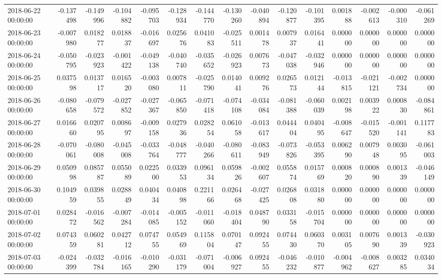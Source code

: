 \begin{tabular}{lrrrrrrrrrrrrrr}
2018-06-22 00:00:00 & -0.137498 & -0.149996 & -0.104882 & -0.095703 & -0.128934 & -0.144770 & -0.130260 & -0.040894 & -0.120877 & -0.101395 & 0.001888 & -0.002613 & -0.000310 & -0.061269 \\
2018-06-23 00:00:00 & -0.007980 & 0.018277 & 0.018837 & -0.016697 & 0.025676 & 0.041083 & -0.025511 & 0.001478 & 0.007937 & 0.016441 & 0.000000 & 0.000000 & 0.000000 & 0.000000 \\
2018-06-24 00:00:00 & -0.050795 & -0.023923 & -0.001422 & -0.049138 & -0.040740 & -0.035652 & -0.026923 & 0.007673 & -0.047038 & -0.032946 & 0.000000 & 0.000000 & 0.000000 & 0.000000 \\
2018-06-25 00:00:00 & 0.037598 & 0.013717 & 0.016520 & -0.003080 & 0.007811 & -0.025790 & 0.014041 & 0.009276 & 0.026573 & 0.012144 & -0.013815 & -0.021121 & -0.002734 & 0.000000 \\
2018-06-26 00:00:00 & -0.080658 & -0.079572 & -0.027852 & -0.027367 & -0.065850 & -0.071418 & -0.074108 & -0.034084 & -0.081388 & -0.060039 & 0.002198 & 0.003922 & 0.000830 & -0.084861 \\
2018-06-27 00:00:00 & 0.016660 & 0.020795 & 0.008697 & -0.009158 & 0.027936 & 0.028254 & 0.061058 & -0.013617 & 0.044404 & 0.040495 & -0.008647 & -0.015520 & -0.001141 & 0.117783 \\
2018-06-28 00:00:00 & -0.070061 & -0.080008 & -0.045008 & -0.033764 & -0.048777 & -0.040266 & -0.080611 & -0.083949 & -0.073826 & -0.053395 & 0.006290 & 0.007948 & 0.003095 & -0.061003 \\
2018-06-29 00:00:00 & 0.050998 & 0.085787 & 0.055089 & 0.022500 & 0.033953 & 0.096134 & 0.059826 & -0.002607 & 0.055874 & 0.015769 & 0.000820 & 0.000890 & 0.001339 & -0.046149 \\
2018-06-30 00:00:00 & 0.104959 & 0.039855 & 0.028849 & 0.040434 & 0.040898 & 0.221166 & 0.026468 & -0.027425 & 0.026808 & 0.031880 & 0.000000 & 0.000000 & 0.000000 & 0.000000 \\
2018-07-01 00:00:00 & 0.028472 & -0.016562 & -0.007284 & -0.014085 & -0.005152 & -0.011060 & -0.018404 & 0.048790 & 0.033158 & -0.015704 & 0.000000 & 0.000000 & 0.000000 & 0.000000 \\
2018-07-02 00:00:00 & 0.074359 & 0.060281 & 0.042712 & 0.074755 & 0.054969 & 0.115804 & 0.070147 & 0.092455 & 0.074430 & 0.060370 & 0.003105 & 0.007690 & 0.001339 & -0.030923 \\
2018-07-03 00:00:00 & -0.024399 & -0.032784 & -0.016165 & -0.010290 & -0.031179 & -0.071004 & -0.006927 & 0.092455 & -0.046232 & -0.010877 & -0.004962 & -0.008627 & 0.003285 & 0.034034 \\

\end{tabular}
